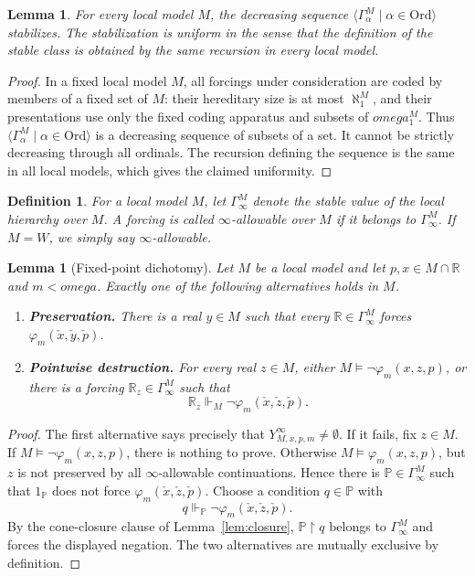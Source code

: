 \documentclass{article}
\newtheorem{lemma}[theorem]{Lemma}
\newtheorem{definition}[theorem]{Definition}
\theoremstyle{remark}
\theoremstyle{plain}
\newcommand{\forceP}{\mathbb{P}}
\newcommand{\forceR}{\mathbb{R}}
\newcommand{\one}{\mathbf{1}}
\newcommand{\Ord}{\mathrm{Ord}}
\newcommand{\Real}{\mathbb{R}}
\def\mathbf#1{#1}%
\def\omega{omega}%
\begin{document}
\begin{lemma}\label{lem:stabilization}
For every local model $M$, the decreasing sequence
$\langle\Gamma^M_\alpha\mid\alpha\in\Ord\rangle$ stabilizes. The stabilization
is uniform in the sense that the definition of the stable class is obtained by
the same recursion in every local model.
\end{lemma}

\begin{proof}
In a fixed local model $M$, all forcings under consideration are coded by members
of a fixed set of $M$: their hereditary size is at most $\aleph_1^M$, and their
presentations use only the fixed coding apparatus and subsets of $\omega_1^M$.
Thus $\langle\Gamma^M_\alpha\mid\alpha\in\Ord\rangle$ is a decreasing sequence of
subsets of a set. It cannot be strictly decreasing through all ordinals. The
recursion defining the sequence is the same in all local models, which gives the
claimed uniformity.
\end{proof}

\begin{definition}\label{def:infty}
For a local model $M$, let $\Gamma^M_\infty$ denote the stable value of the local
hierarchy over $M$. A forcing is called \emph{$\infty$-allowable over $M$} if it
belongs to $\Gamma^M_\infty$. If $M=W$, we simply say \emph{$\infty$-allowable}.
\end{definition}

\begin{lemma}[Fixed-point dichotomy]\label{lem:dichotomy}
Let $M$ be a local model and let $p,x\in M\cap\Real$ and $m<\omega$. Exactly one
of the following alternatives holds in $M$.
\begin{enumerate}[label=\textup{(\roman*)}]
\item \textbf{Preservation.} There is a real $y\in M$ such that every
$\forceR\in\Gamma^M_\infty$ forces
$\varphi_m(\check x,\check y,\check p)$.
\item \textbf{Pointwise destruction.} For every real $z\in M$, either
$M\models\neg\varphi_m(x,z,p)$, or there is a forcing
$\forceR_z\in\Gamma^M_\infty$ such that
\[
   \forceR_z\Vdash_M\neg\varphi_m(\check x,\check z,\check p).
\]
\end{enumerate}
\end{lemma}

\begin{proof}
The first alternative says precisely that $Y^\infty_{M,x,p,m}\neq\emptyset$. If
it fails, fix $z\in M$. If $M\models\neg\varphi_m(x,z,p)$, there is nothing to
prove. Otherwise $M\models\varphi_m(x,z,p)$, but $z$ is not preserved by all
$\infty$-allowable continuations. Hence there is
$\forceP\in\Gamma^M_\infty$ such that
$\one_\forceP$ does not force $\varphi_m(\check x,\check z,\check p)$. Choose a
condition $q\in\forceP$ with
\[
   q\Vdash_\forceP\neg\varphi_m(\check x,\check z,\check p).
\]
By the cone-closure clause of Lemma~\ref{lem:closure},
$\forceP\restriction q$ belongs to $\Gamma^M_\infty$ and forces the displayed
negation. The two alternatives are mutually exclusive by definition.
\end{proof}
\end{document}
